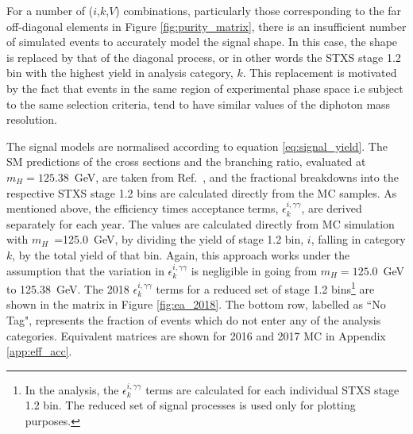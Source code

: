 For a number of ($i$,$k$,$V$) combinations, particularly those corresponding to the far off-diagonal elements in Figure \ref{fig:purity_matrix}, there is an insufficient number of simulated events to accurately model the signal shape. In this case, the shape is replaced by that of the diagonal process, or in other words the STXS stage 1.2 bin with the highest yield in analysis category, $k$. This replacement is motivated by the fact that events in the same region of experimental phase space i.e subject to the same selection criteria, tend to have similar values of the diphoton mass resolution.

The signal models are normalised according to equation \ref{eq:signal_yield}. The SM predictions of the cross sections and the \Hgg branching ratio, evaluated at $m_H=125.38$~GeV, are taken from Ref.~\cite{deFlorian:2016spz}, and the fractional breakdowns into the respective STXS stage 1.2 bins are calculated directly from the MC samples. As mentioned above, the efficiency times acceptance terms, $\epsilon^{i,\gamma\gamma}_{k}$, are derived separately for each year. The values are calculated directly from MC simulation with $m_H$~=125.0~GeV, by dividing the yield of stage 1.2 bin, $i$, falling in category $k$, by the total yield of that bin. Again, this approach works under the assumption that the variation in $\epsilon^{i,\gamma\gamma}_{k}$ is negligible in going from $m_H=125.0$~GeV to 125.38~GeV. The 2018 $\epsilon^{i,\gamma\gamma}_{k}$ terms for a reduced set of stage 1.2 bins\footnote{In the analysis, the $\epsilon^{i,\gamma\gamma}_{k}$ terms are calculated for each individual STXS stage 1.2 bin. The reduced set of signal processes is used only for plotting purposes.} are shown in the matrix in Figure \ref{fig:ea_2018}. The bottom row, labelled as ``No Tag", represents the fraction of events which do not enter any of the analysis categories. Equivalent matrices are shown for 2016 and 2017 MC in Appendix \ref{app:eff_acc}.

